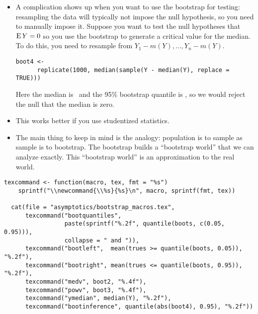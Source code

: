 \begin{itemize}

\item A complication shows up when you want to use the bootstrap for
  testing: resampling the data will typically not impose the null
  hypothesis, so you need to manually impose it.  Suppose you want to
  test the null hypotheses that $\operatorname{E} Y = 0$ so you use the bootstrap to
  generate a critical value for the median.  To do this, you need to
  resample from $Y_1 - m(Y),...,Y_n - m(Y)$.
  \begin{lstlisting}[firstline=2,gobble=6]
    boot4 <-
      replicate(1000, median(sample(Y - median(Y), replace = TRUE)))
  \end{lstlisting}
  Here the median is \ymedian\ and the 95\% bootstrap quantile is
  \bootinference, so we would reject the null that the median is zero.

\item This works better if you use studentized statistics.
  
\item The main thing to keep in mind is the analogy: population is to
  sample as sample is to bootstrap.  The bootstrap builds a
  ``bootstrap world'' that we can analyze exactly.  This ``bootstrap
  world'' is an approximation to the real world.

\end{itemize}

\begin{lstlisting}[print=false]
  texcommand <- function(macro, tex, fmt = "%s")
    sprintf("\\newcommand{\\%s}{%s}\n", macro, sprintf(fmt, tex))

  cat(file = "asymptotics/bootstrap_macros.tex",
      texcommand("bootquantiles",
                 paste(sprintf("%.2f", quantile(boots, c(0.05, 0.95))),
                 collapse = " and ")),
      texcommand("bootleft",  mean(trues >= quantile(boots, 0.05)), "%.2f"),
      texcommand("bootright", mean(trues <= quantile(boots, 0.95)), "%.2f"),
      texcommand("medv", boot2, "%.4f"),
      texcommand("powv", boot3, "%.4f"),
      texcommand("ymedian", median(Y), "%.2f"),
      texcommand("bootinference", quantile(abs(boot4), 0.95), "%.2f"))
\end{lstlisting}

